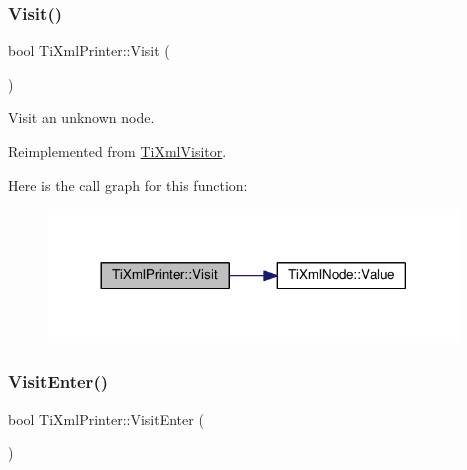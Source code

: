 \subsubsection{\texorpdfstring{Visit()}{Visit()}\hspace{0.1cm}{\footnotesize\ttfamily [4/4]}}
{\footnotesize\ttfamily bool Ti\+Xml\+Printer\+::\+Visit (\begin{DoxyParamCaption}\item[{const \hyperlink{class_ti_xml_unknown}{Ti\+Xml\+Unknown} \&}]{ }\end{DoxyParamCaption})\hspace{0.3cm}{\ttfamily [virtual]}}



Visit an unknown node. 



Reimplemented from \hyperlink{class_ti_xml_visitor_a7e284d607d275c51dac1adb58159ce28}{Ti\+Xml\+Visitor}.

Here is the call graph for this function\+:
\nopagebreak
\begin{figure}[H]
\begin{center}
\leavevmode
\includegraphics[width=308pt]{class_ti_xml_printer_a08591a15c9a07afa83c24e08b03d6358_cgraph}
\end{center}
\end{figure}
\mbox{\label{class_ti_xml_printer_a2ec73087db26ff4d2c4316c56f861db7}} 
\subsubsection{\texorpdfstring{Visit\+Enter()}{VisitEnter()}\hspace{0.1cm}{\footnotesize\ttfamily [1/2]}}
{\footnotesize\ttfamily bool Ti\+Xml\+Printer\+::\+Visit\+Enter (\begin{DoxyParamCaption}\item[{const \hyperlink{class_ti_xml_document}{Ti\+Xml\+Document} \&}]{ }\end{DoxyParamCaption})\hspace{0.3cm}{\ttfamily [virtual]}}



